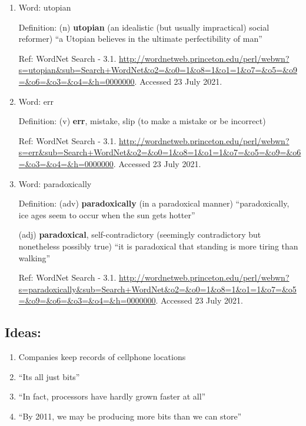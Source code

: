 \documentclass[11pt]{article}
\begin{document}
\begin{enumerate}
\item Word: utopian

Definition: (n) \textbf{utopian} (an idealistic (but usually impractical) social reformer) ``a Utopian believes in the ultimate perfectibility of man''

Ref: WordNet Search - 3.1. \url{http://wordnetweb.princeton.edu/perl/webwn?s=utopian\&sub=Search+WordNet\&o2=\&o0=1\&o8=1\&o1=1\&o7=\&o5=\&o9=\&o6=\&o3=\&o4=\&h=0000000}. Accessed 23 July 2021.

\item Word: err

Definition: (v) \textbf{err}, mistake, slip (to make a mistake or be incorrect)

Ref: WordNet Search - 3.1. \url{http://wordnetweb.princeton.edu/perl/webwn?s=err\&sub=Search+WordNet\&o2=\&o0=1\&o8=1\&o1=1\&o7=\&o5=\&o9=\&o6=\&o3=\&o4=\&h=0000000}. Accessed 23 July 2021.

\item Word: paradoxically

Definition: (adv) \textbf{paradoxically} (in a paradoxical manner) ``paradoxically,  ice ages seem to occur when the sun gets hotter''

(adj) \textbf{paradoxical}, self-contradictory (seemingly contradictory but nonetheless possibly true) ``it is paradoxical that standing is more tiring than walking''

Ref: WordNet Search - 3.1. \url{http://wordnetweb.princeton.edu/perl/webwn?s=paradoxically\&sub=Search+WordNet\&o2=\&o0=1\&o8=1\&o1=1\&o7=\&o5=\&o9=\&o6=\&o3=\&o4=\&h=0000000}. Accessed 23 July 2021.
\end{enumerate}

\subsection{Ideas:}
\label{sec:org38d1e55}
\begin{enumerate}
\item Companies keep records of cellphone locations
\item ``Its all just bits''
\item ``In fact, processors have hardly grown faster at all''
\item ``By 2011, we may be producing more bits than we can store''
\end{enumerate}
\end{document}
